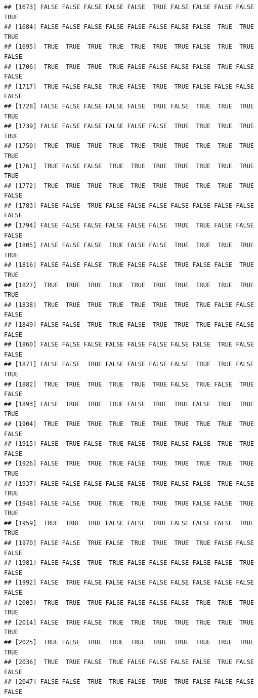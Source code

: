 \documentclass{article}\usepackage[]{graphicx}\usepackage[]{color}
\makeatletter
\newenvironment{kframe}{%
 \def\at@end@of@kframe{}%
 \ifinner\ifhmode%
  \def\at@end@of@kframe{\end{minipage}}%
  \begin{minipage}{\columnwidth}%
 \fi\fi%
 \def\FrameCommand##1{\hskip\@totalleftmargin \hskip-\fboxsep
 \colorbox{shadecolor}{##1}\hskip-\fboxsep
     \hskip-\linewidth \hskip-\@totalleftmargin \hskip\columnwidth}%
 \MakeFramed {\advance\hsize-\width
   \@totalleftmargin\z@ \linewidth\hsize
   \@setminipage}}%
 {\par\unskip\endMakeFramed%
 \at@end@of@kframe}
\newenvironment{knitrout}{}{} %
\makeatother
\begin{document}
\begin{knitrout}
\begin{kframe}
\begin{verbatim}
## [1673] FALSE FALSE FALSE FALSE FALSE  TRUE FALSE FALSE FALSE FALSE  TRUE
## [1684] FALSE FALSE FALSE FALSE FALSE FALSE FALSE FALSE  TRUE  TRUE  TRUE
## [1695]  TRUE  TRUE  TRUE  TRUE  TRUE  TRUE  TRUE FALSE  TRUE  TRUE FALSE
## [1706]  TRUE  TRUE  TRUE  TRUE FALSE FALSE FALSE FALSE  TRUE FALSE FALSE
## [1717]  TRUE FALSE FALSE  TRUE FALSE  TRUE  TRUE FALSE FALSE FALSE FALSE
## [1728] FALSE FALSE FALSE FALSE FALSE  TRUE FALSE  TRUE  TRUE  TRUE  TRUE
## [1739] FALSE FALSE FALSE FALSE FALSE FALSE  TRUE  TRUE  TRUE  TRUE  TRUE
## [1750]  TRUE  TRUE  TRUE  TRUE  TRUE  TRUE  TRUE  TRUE  TRUE  TRUE  TRUE
## [1761]  TRUE FALSE FALSE  TRUE  TRUE  TRUE  TRUE  TRUE  TRUE  TRUE  TRUE
## [1772]  TRUE  TRUE  TRUE  TRUE  TRUE  TRUE  TRUE  TRUE  TRUE  TRUE FALSE
## [1783] FALSE FALSE  TRUE FALSE FALSE FALSE FALSE FALSE FALSE FALSE FALSE
## [1794] FALSE FALSE FALSE FALSE FALSE FALSE  TRUE  TRUE FALSE FALSE FALSE
## [1805] FALSE FALSE FALSE  TRUE FALSE FALSE  TRUE  TRUE  TRUE  TRUE  TRUE
## [1816] FALSE FALSE FALSE  TRUE FALSE FALSE  TRUE FALSE FALSE  TRUE  TRUE
## [1827]  TRUE  TRUE  TRUE  TRUE  TRUE  TRUE  TRUE  TRUE  TRUE  TRUE  TRUE
## [1838]  TRUE  TRUE  TRUE  TRUE  TRUE  TRUE  TRUE  TRUE FALSE FALSE FALSE
## [1849] FALSE FALSE  TRUE  TRUE FALSE  TRUE  TRUE  TRUE FALSE FALSE FALSE
## [1860] FALSE FALSE FALSE FALSE FALSE FALSE FALSE FALSE  TRUE FALSE FALSE
## [1871] FALSE FALSE  TRUE FALSE FALSE FALSE FALSE  TRUE  TRUE FALSE  TRUE
## [1882]  TRUE  TRUE  TRUE  TRUE  TRUE  TRUE FALSE  TRUE FALSE  TRUE FALSE
## [1893] FALSE  TRUE  TRUE  TRUE FALSE  TRUE  TRUE FALSE  TRUE  TRUE  TRUE
## [1904]  TRUE  TRUE  TRUE  TRUE  TRUE  TRUE  TRUE  TRUE  TRUE  TRUE FALSE
## [1915] FALSE  TRUE FALSE  TRUE FALSE  TRUE FALSE FALSE  TRUE  TRUE FALSE
## [1926] FALSE  TRUE  TRUE  TRUE FALSE  TRUE  TRUE  TRUE  TRUE  TRUE  TRUE
## [1937] FALSE FALSE FALSE FALSE FALSE  TRUE FALSE FALSE  TRUE FALSE  TRUE
## [1948] FALSE FALSE  TRUE  TRUE  TRUE  TRUE  TRUE FALSE FALSE  TRUE  TRUE
## [1959]  TRUE  TRUE  TRUE FALSE FALSE  TRUE FALSE FALSE FALSE  TRUE  TRUE
## [1970] FALSE FALSE  TRUE FALSE  TRUE  TRUE  TRUE  TRUE FALSE FALSE FALSE
## [1981] FALSE FALSE  TRUE  TRUE FALSE FALSE FALSE FALSE FALSE  TRUE FALSE
## [1992] FALSE  TRUE FALSE FALSE FALSE FALSE FALSE FALSE FALSE FALSE FALSE
## [2003]  TRUE  TRUE  TRUE FALSE FALSE FALSE FALSE  TRUE  TRUE  TRUE  TRUE
## [2014] FALSE  TRUE FALSE  TRUE  TRUE  TRUE  TRUE  TRUE  TRUE  TRUE  TRUE
## [2025]  TRUE FALSE  TRUE  TRUE  TRUE  TRUE  TRUE  TRUE  TRUE  TRUE  TRUE
## [2036]  TRUE  TRUE FALSE  TRUE FALSE FALSE FALSE FALSE  TRUE FALSE FALSE
## [2047] FALSE FALSE  TRUE  TRUE FALSE  TRUE  TRUE FALSE FALSE FALSE FALSE

\end{verbatim}
\end{kframe}
\end{knitrout}
\end{document}
